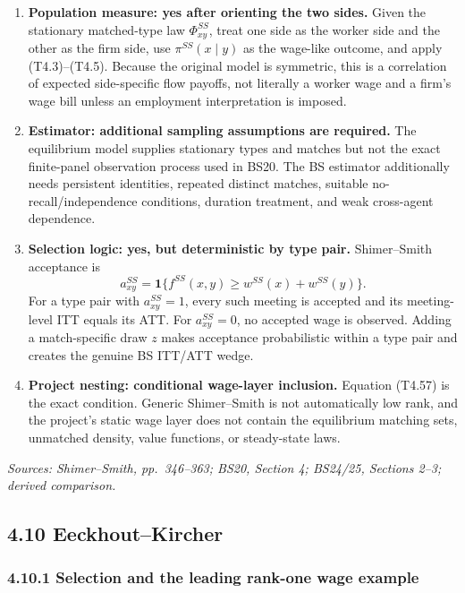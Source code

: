 \documentclass[11pt]{article}
\begin{document}
\begin{enumerate}
\item \textbf{Population measure: yes after orienting the two sides.}  Given
  the stationary matched-type law \(\Phi^{SS}_{xy}\), treat one side as the
  worker side and the other as the firm side, use
  \(\pi^{SS}(x\mid y)\) as the wage-like outcome, and apply
  (T4.3)--(T4.5).  Because the original model is symmetric, this is a
  correlation of expected side-specific flow payoffs, not literally a
  worker wage and a firm's wage bill unless an employment interpretation is
  imposed.
\item \textbf{Estimator: additional sampling assumptions are required.}
  The equilibrium model supplies stationary types and matches but not the
  exact finite-panel observation process used in BS20.  The BS estimator
  additionally needs persistent identities, repeated distinct matches,
  suitable no-recall/independence conditions, duration treatment, and weak
  cross-agent dependence.
\item \textbf{Selection logic: yes, but deterministic by type pair.}
  Shimer--Smith acceptance is
  \[
  a^{SS}_{xy}
  =
  \mathbf 1\{
  f^{SS}(x,y)\geq w^{SS}(x)+w^{SS}(y)
  \}.
  \tag{T4.58}
  \]
  For a type pair with \(a^{SS}_{xy}=1\), every such meeting is accepted and
  its meeting-level ITT equals its ATT.  For
  \(a^{SS}_{xy}=0\), no accepted wage is observed.  Adding a match-specific
  draw \(z\) makes acceptance probabilistic within a type pair and creates
  the genuine BS ITT/ATT wedge.
\item \textbf{Project nesting: conditional wage-layer inclusion.}
  Equation (T4.57) is the exact condition.  Generic Shimer--Smith is not
  automatically low rank, and the project's static wage layer does not
  contain the equilibrium matching sets, unmatched density, value functions,
  or steady-state laws.
\end{enumerate}

\textit{Sources: Shimer--Smith, pp.\ 346--363; BS20, Section 4; BS24/25,
Sections 2--3; derived comparison.}

\subsection{4.10 Eeckhout--Kircher}

\subsubsection{4.10.1 Selection and the leading rank-one wage example}
\end{document}
